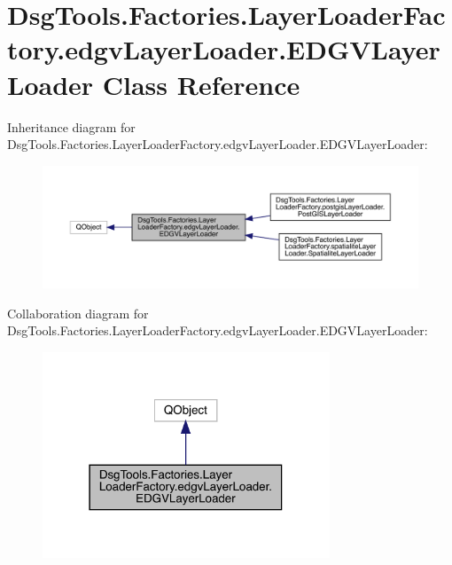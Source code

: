 \hypertarget{class_dsg_tools_1_1_factories_1_1_layer_loader_factory_1_1edgv_layer_loader_1_1_e_d_g_v_layer_loader}{}\section{Dsg\+Tools.\+Factories.\+Layer\+Loader\+Factory.\+edgv\+Layer\+Loader.\+E\+D\+G\+V\+Layer\+Loader Class Reference}
\label{class_dsg_tools_1_1_factories_1_1_layer_loader_factory_1_1edgv_layer_loader_1_1_e_d_g_v_layer_loader}


Inheritance diagram for Dsg\+Tools.\+Factories.\+Layer\+Loader\+Factory.\+edgv\+Layer\+Loader.\+E\+D\+G\+V\+Layer\+Loader\+:
\nopagebreak
\begin{figure}[H]
\begin{center}
\leavevmode
\includegraphics[width=350pt]{class_dsg_tools_1_1_factories_1_1_layer_loader_factory_1_1edgv_layer_loader_1_1_e_d_g_v_layer_loader__inherit__graph}
\end{center}
\end{figure}


Collaboration diagram for Dsg\+Tools.\+Factories.\+Layer\+Loader\+Factory.\+edgv\+Layer\+Loader.\+E\+D\+G\+V\+Layer\+Loader\+:
\nopagebreak
\begin{figure}[H]
\begin{center}
\leavevmode
\includegraphics[width=243pt]{class_dsg_tools_1_1_factories_1_1_layer_loader_factory_1_1edgv_layer_loader_1_1_e_d_g_v_layer_loader__coll__graph}
\end{center}
\end{figure}
